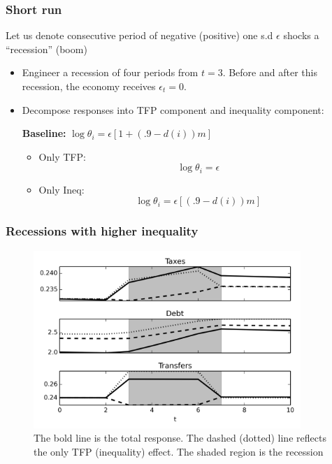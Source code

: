 \documentclass{beamer}
\begin{document}
\begin{frame}
\frametitle{Short run}
Let us denote consecutive period of negative (positive) one s.d $\epsilon$ shocks a ``recession'' (boom)

\begin{itemize}
\item Engineer a recession of four periods from $t=3$. Before and after this recession, the economy receives $\epsilon_t=0$.
 
 \item Decompose responses into TFP component and inequality component:
  
 \vspace{3mm}
\centering  \textbf{Baseline:} $\log \theta_i=\epsilon [1+(.9-d(i))m]$
 \vspace{3mm}
 \begin{itemize}
  \item Only TFP: \[\log \theta_i=\epsilon\]
  \item Only Ineq: \[\log \theta_i=\epsilon [(.9-d(i))m]\]
\end{itemize}

\end{itemize}
 
\end{frame}


\begin{frame}
\frametitle{Recessions with higher inequality}
{
  \begin{figure}
    \centering
    \includegraphics[width = 0.9\textwidth]{cesplots/irf_bm_chi_shocks.png}
    \caption{The bold line is the total response. The dashed (dotted) line reflects the only TFP (inequality) effect. The shaded region is the recession}
  \end{figure}

} 
\end{frame}
\end{document}
